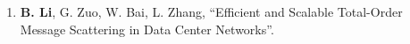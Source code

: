\begin{publications}
\begin{enumerate}
\item \textbf{B. Li}, G. Zuo, W. Bai, L. Zhang, ``Efficient and Scalable Total-Order Message Scattering in Data Center Networks''.
\end{enumerate}


\end{publications}
